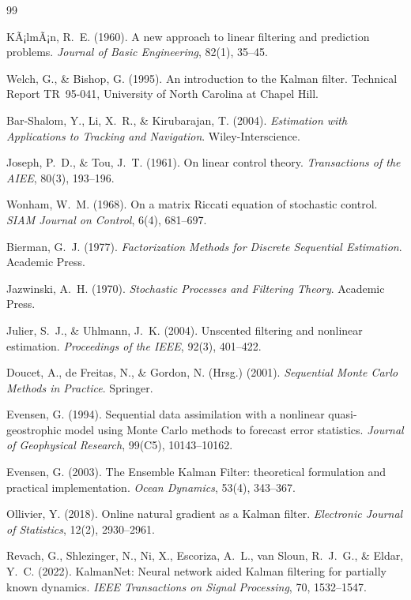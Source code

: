 ﻿\documentclass[a4paper,12pt]{article}
\theoremstyle{definition}
\begin{document}
\begin{thebibliography}{99}

KÃ¡lmÃ¡n, R.~E. (1960).
A new approach to linear filtering and prediction problems.
\emph{Journal of Basic Engineering}, 82(1), 35--45.

Welch, G., \& Bishop, G. (1995).
An introduction to the Kalman filter.
Technical Report TR~95-041, University of North Carolina at Chapel Hill.

Bar-Shalom, Y., Li, X.~R., \& Kirubarajan, T. (2004).
\emph{Estimation with Applications to Tracking and Navigation}.
Wiley-Interscience.

Joseph, P.~D., \& Tou, J.~T. (1961).
On linear control theory.
\emph{Transactions of the AIEE}, 80(3), 193--196.

Wonham, W.~M. (1968).
On a matrix Riccati equation of stochastic control.
\emph{SIAM Journal on Control}, 6(4), 681--697.

Bierman, G.~J. (1977).
\emph{Factorization Methods for Discrete Sequential Estimation}.
Academic Press.

Jazwinski, A.~H. (1970).
\emph{Stochastic Processes and Filtering Theory}.
Academic Press.

Julier, S.~J., \& Uhlmann, J.~K. (2004).
Unscented filtering and nonlinear estimation.
\emph{Proceedings of the IEEE}, 92(3), 401--422.

Doucet, A., de Freitas, N., \& Gordon, N. (Hrsg.) (2001).
\emph{Sequential Monte Carlo Methods in Practice}.
Springer.

Evensen, G. (1994).
Sequential data assimilation with a nonlinear quasi-geostrophic model
using Monte Carlo methods to forecast error statistics.
\emph{Journal of Geophysical Research}, 99(C5), 10143--10162.

Evensen, G. (2003).
The Ensemble Kalman Filter: theoretical formulation and practical implementation.
\emph{Ocean Dynamics}, 53(4), 343--367.

Ollivier, Y. (2018).
Online natural gradient as a Kalman filter.
\emph{Electronic Journal of Statistics}, 12(2), 2930--2961.

Revach, G., Shlezinger, N., Ni, X., Escoriza, A.~L., van Sloun, R.~J.~G.,
\& Eldar, Y.~C. (2022).
KalmanNet: Neural network aided Kalman filtering for partially known dynamics.
\emph{IEEE Transactions on Signal Processing}, 70, 1532--1547.


\end{thebibliography}
\end{document}
